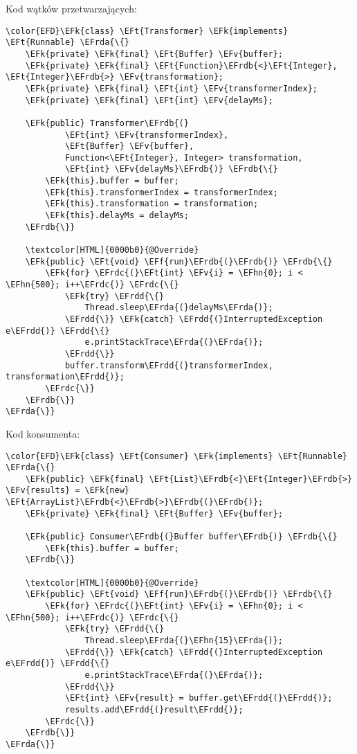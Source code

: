 \documentclass[11pt]{article}
\newcommand{\EFk}[1]{\textcolor{EFk}{#1}} %
\newcommand{\EFf}[1]{\textcolor{EFf}{#1}} %
\newcommand{\EFv}[1]{\textcolor{EFv}{#1}} %
\newcommand{\EFt}[1]{\textcolor{EFt}{#1}} %
\newcommand{\EFhn}[1]{\textcolor{EFhn}{#1}} %
\newcommand{\EFrda}[1]{#1} %
\newcommand{\EFrdb}[1]{\textcolor{EFrdb}{#1}} %
\newcommand{\EFrdc}[1]{\textcolor{EFrdc}{#1}} %
\newcommand{\EFrdd}[1]{\textcolor{EFrdd}{#1}} %
\begin{document}
Kod wątków przetwarzających:
\begin{Code}
\begin{Verbatim}
\color{EFD}\EFk{class} \EFt{Transformer} \EFk{implements} \EFt{Runnable} \EFrda{\{}
    \EFk{private} \EFk{final} \EFt{Buffer} \EFv{buffer};
    \EFk{private} \EFk{final} \EFt{Function}\EFrdb{<}\EFt{Integer}, \EFt{Integer}\EFrdb{>} \EFv{transformation};
    \EFk{private} \EFk{final} \EFt{int} \EFv{transformerIndex};
    \EFk{private} \EFk{final} \EFt{int} \EFv{delayMs};

    \EFk{public} Transformer\EFrdb{(}
            \EFt{int} \EFv{transformerIndex},
            \EFt{Buffer} \EFv{buffer},
            Function<\EFt{Integer}, Integer> transformation,
            \EFt{int} \EFv{delayMs}\EFrdb{)} \EFrdb{\{}
        \EFk{this}.buffer = buffer;
        \EFk{this}.transformerIndex = transformerIndex;
        \EFk{this}.transformation = transformation;
        \EFk{this}.delayMs = delayMs;
    \EFrdb{\}}

    \textcolor[HTML]{0000b0}{@Override}
    \EFk{public} \EFt{void} \EFf{run}\EFrdb{(}\EFrdb{)} \EFrdb{\{}
        \EFk{for} \EFrdc{(}\EFt{int} \EFv{i} = \EFhn{0}; i < \EFhn{500}; i++\EFrdc{)} \EFrdc{\{}
            \EFk{try} \EFrdd{\{}
                Thread.sleep\EFrda{(}delayMs\EFrda{)};
            \EFrdd{\}} \EFk{catch} \EFrdd{(}InterruptedException e\EFrdd{)} \EFrdd{\{}
                e.printStackTrace\EFrda{(}\EFrda{)};
            \EFrdd{\}}
            buffer.transform\EFrdd{(}transformerIndex, transformation\EFrdd{)};
        \EFrdc{\}}
    \EFrdb{\}}
\EFrda{\}}
\end{Verbatim}
\end{Code}

Kod konsumenta:
\begin{Code}
\begin{Verbatim}
\color{EFD}\EFk{class} \EFt{Consumer} \EFk{implements} \EFt{Runnable} \EFrda{\{}
    \EFk{public} \EFk{final} \EFt{List}\EFrdb{<}\EFt{Integer}\EFrdb{>} \EFv{results} = \EFk{new} \EFt{ArrayList}\EFrdb{<}\EFrdb{>}\EFrdb{(}\EFrdb{)};
    \EFk{private} \EFk{final} \EFt{Buffer} \EFv{buffer};

    \EFk{public} Consumer\EFrdb{(}Buffer buffer\EFrdb{)} \EFrdb{\{}
        \EFk{this}.buffer = buffer;
    \EFrdb{\}}

    \textcolor[HTML]{0000b0}{@Override}
    \EFk{public} \EFt{void} \EFf{run}\EFrdb{(}\EFrdb{)} \EFrdb{\{}
        \EFk{for} \EFrdc{(}\EFt{int} \EFv{i} = \EFhn{0}; i < \EFhn{500}; i++\EFrdc{)} \EFrdc{\{}
            \EFk{try} \EFrdd{\{}
                Thread.sleep\EFrda{(}\EFhn{15}\EFrda{)};
            \EFrdd{\}} \EFk{catch} \EFrdd{(}InterruptedException e\EFrdd{)} \EFrdd{\{}
                e.printStackTrace\EFrda{(}\EFrda{)};
            \EFrdd{\}}
            \EFt{int} \EFv{result} = buffer.get\EFrdd{(}\EFrdd{)};
            results.add\EFrdd{(}result\EFrdd{)};
        \EFrdc{\}}
    \EFrdb{\}}
\EFrda{\}}
\end{Verbatim}
\end{Code}
\end{document}
